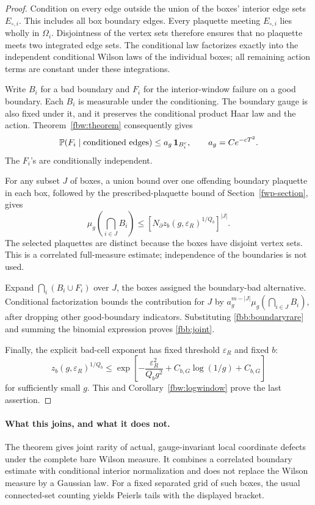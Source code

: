 \documentclass[11pt]{article}
\theoremstyle{remark}
\begin{document}
\begin{proof}
Condition on every edge outside the union of the boxes' interior
edge sets \(E_{\circ,i}\). This includes all box boundary edges.
Every plaquette meeting \(E_{\circ,i}\) lies wholly in \(\Omega_i\).
Disjointness of the vertex sets therefore ensures that no plaquette
meets two integrated edge sets. The conditional law factorizes
exactly into the independent conditional Wilson laws of the
individual boxes; all remaining action terms are constant under
these integrations.

Write \(B_i\) for a bad boundary and \(F_i\) for the interior-window
failure on a good boundary. Each \(B_i\) is measurable under the
conditioning. The boundary gauge is also fixed under it, and it
preserves the conditional product Haar law and the action.
Theorem~\ref{fbw:theorem} consequently gives
\[
 \mathbb P(F_i\mid\hbox{conditioned edges})
 \leq a_g\,\mathbf1_{B_i^c},\qquad a_g=Ce^{-cT^2}.
\]
The \(F_i\)'s are conditionally independent.

For any subset \(J\) of boxes, a union bound over one offending
boundary plaquette in each box, followed by the prescribed-plaquette
bound of Section~\ref{fwp-section}, gives
\begin{equation}
 \mu_g\left(\bigcap_{i\in J}B_i\right)
 \leq \left[N_\partial
              z_b(g,\varepsilon_R)^{1/Q_b}\right]^{|J|}.
 \label{fbb:boundaryrare}
\end{equation}
The selected plaquettes are distinct because the boxes have disjoint
vertex sets. This is a correlated full-measure estimate; independence
of the boundaries is not used.

Expand \(\bigcap_i(B_i\cup F_i)\) over \(J\), the boxes assigned
the boundary-bad alternative. Conditional factorization bounds
the contribution for \(J\) by
\(a_g^{m-|J|}\mu_g(\bigcap_{i\in J}B_i)\), after dropping other
good-boundary indicators. Substituting
\eqref{fbb:boundaryrare} and summing the binomial expression proves
\eqref{fbb:joint}.

Finally, the explicit bad-cell exponent has fixed threshold
\(\varepsilon_R\) and fixed \(b\):
\[
 z_b(g,\varepsilon_R)^{1/Q_b}
 \leq \exp\left[-\frac{\varepsilon_R^2}{Q_b g^2}
                       +C_{b,G}\log(1/g)+C_{b,G}\right]
\]
for sufficiently small \(g\). This and
Corollary~\ref{fbw:logwindow} prove the last assertion.
\end{proof}

\paragraph{What this joins, and what it does not.}
The theorem gives joint rarity of actual, gauge-invariant local
coordinate defects under the complete bare Wilson measure. It
combines a correlated boundary estimate with conditional interior
normalization and does not replace the Wilson measure by a Gaussian
law. For a fixed separated grid of such boxes, the usual connected-set
counting yields Peierls tails with the displayed bracket.
\end{document}
